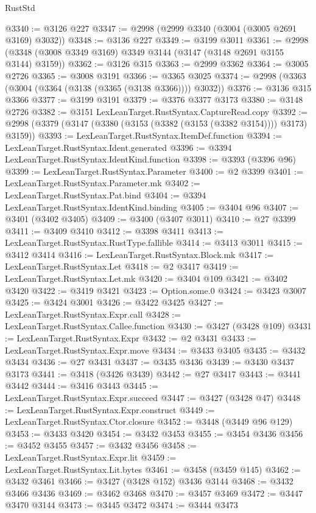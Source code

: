 \begin{lexlean}{RustStd}
\begin{coremodule}
@3340 := @3126 @227
@3347 := @2998 (@2999 @3340 (@3004 (@3005 @2691 @3169) @3032))
@3348 := @3136 @227
@3349 := @3199 @3011
@3361 := @2998 (@3348 (@3008 @3349 @3169) @3349 @3144 (@3147 (@3148 @2691 @3155 @3144) @3159))
@3362 := @3126 @315
@3363 := @2999 @3362
@3364 := @3005 @2726
@3365 := @3008 @3191
@3366 := @3365 @3025
@3374 := @2998 (@3363 (@3004 (@3364 (@3138 (@3365 (@3138 @3366)))) @3032))
@3376 := @3136 @315 @3366
@3377 := @3199 @3191
@3379 := @3376 @3377 @3173
@3380 := @3148 @2726
@3382 := @3151 LexLeanTarget.RustSyntax.CaptureRead.copy
@3392 := @2998 (@3379 (@3147 (@3380 (@3153 (@3382 (@3153 (@3382 @3154)))) @3173) @3159))
@3393 := LexLeanTarget.RustSyntax.ItemDef.function
@3394 := LexLeanTarget.RustSyntax.Ident.generated
@3396 := @3394 LexLeanTarget.RustSyntax.IdentKind.function
@3398 := @3393 (@3396 @96)
@3399 := LexLeanTarget.RustSyntax.Parameter
@3400 := @2 @3399
@3401 := LexLeanTarget.RustSyntax.Parameter.mk
@3402 := LexLeanTarget.RustSyntax.Pat.bind
@3404 := @3394 LexLeanTarget.RustSyntax.IdentKind.binding
@3405 := @3404 @96
@3407 := @3401 (@3402 @3405)
@3409 := @3400 (@3407 @3011)
@3410 := @27 @3399
@3411 := @3409 @3410
@3412 := @3398 @3411
@3413 := LexLeanTarget.RustSyntax.RustType.fallible
@3414 := @3413 @3011
@3415 := @3412 @3414
@3416 := LexLeanTarget.RustSyntax.Block.mk
@3417 := LexLeanTarget.RustSyntax.Let
@3418 := @2 @3417
@3419 := LexLeanTarget.RustSyntax.Let.mk
@3420 := @3404 @109
@3421 := @3402 @3420
@3422 := @3419 @3421
@3423 := Option.some.{0}
@3424 := @3423 @3007
@3425 := @3424 @3001
@3426 := @3422 @3425
@3427 := LexLeanTarget.RustSyntax.Expr.call
@3428 := LexLeanTarget.RustSyntax.Callee.function
@3430 := @3427 (@3428 @109)
@3431 := LexLeanTarget.RustSyntax.Expr
@3432 := @2 @3431
@3433 := LexLeanTarget.RustSyntax.Expr.move
@3434 := @3433 @3405
@3435 := @3432 @3434
@3436 := @27 @3431
@3437 := @3435 @3436
@3439 := @3430 @3437 @3173
@3441 := @3418 (@3426 @3439)
@3442 := @27 @3417
@3443 := @3441 @3442
@3444 := @3416 @3443
@3445 := LexLeanTarget.RustSyntax.Expr.succeed
@3447 := @3427 (@3428 @47)
@3448 := LexLeanTarget.RustSyntax.Expr.construct
@3449 := LexLeanTarget.RustSyntax.Ctor.closure
@3452 := @3448 (@3449 @96 @129)
@3453 := @3433 @3420
@3454 := @3432 @3453
@3455 := @3454 @3436
@3456 := @3452 @3455
@3457 := @3432 @3456
@3458 := LexLeanTarget.RustSyntax.Expr.lit
@3459 := LexLeanTarget.RustSyntax.Lit.bytes
@3461 := @3458 (@3459 @145)
@3462 := @3432 @3461
@3466 := @3427 (@3428 @152) @3436 @3144
@3468 := @3432 @3466 @3436
@3469 := @3462 @3468
@3470 := @3457 @3469
@3472 := @3447 @3470 @3144
@3473 := @3445 @3472
@3474 := @3444 @3473

\end{coremodule}
\end{lexlean}
